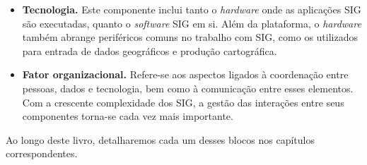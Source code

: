 \begin{itemize}
 \item \textbf{Tecnologia.} Este componente inclui tanto o \emph{hardware} onde as aplicações SIG são executadas, quanto o \emph{software} SIG em si. Além da plataforma, o \emph{hardware} também abrange periféricos comuns no trabalho com SIG, como os utilizados para entrada de dados geográficos e produção cartográfica.

 \item \textbf{Fator organizacional.} Refere-se aos aspectos ligados à coordenação entre pessoas, dados e tecnologia, bem como à comunicação entre esses elementos. Com a crescente complexidade dos SIG, a gestão das interações entre seus componentes torna-se cada vez mais importante.
\end{itemize}

Ao longo deste livro, detalharemos cada um desses blocos nos capítulos correspondentes.

\pagestyle{empty}

